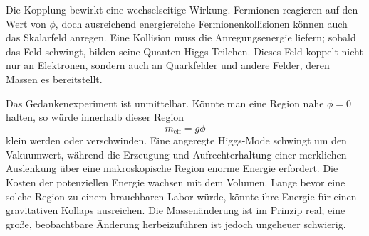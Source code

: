 Die Kopplung bewirkt eine wechselseitige Wirkung. Fermionen reagieren auf den Wert von \(\phi\), doch ausreichend energiereiche Fermionenkollisionen können auch das Skalarfeld anregen. Eine Kollision muss die Anregungsenergie liefern; sobald das Feld schwingt, bilden seine Quanten Higgs-Teilchen. Dieses Feld koppelt nicht nur an Elektronen, sondern auch an Quarkfelder und andere Felder, deren Massen es bereitstellt.

\begin{classroomqa}
\end{classroomqa}

Das Gedankenexperiment ist unmittelbar. Könnte man eine Region nahe \(\phi=0\) halten, so würde innerhalb dieser Region
\begin{equation}
m_{\mathrm{eff}}=g\phi
\end{equation}
klein werden oder verschwinden. Eine angeregte Higgs-Mode schwingt um den Vakuumwert, während die Erzeugung und Aufrechterhaltung einer merklichen Auslenkung über eine makroskopische Region enorme Energie erfordert. Die Kosten der potenziellen Energie wachsen mit dem Volumen. Lange bevor eine solche Region zu einem brauchbaren Labor würde, könnte ihre Energie für einen gravitativen Kollaps ausreichen. Die Massenänderung ist im Prinzip real; eine große, beobachtbare Änderung herbeizuführen ist jedoch ungeheuer schwierig.

\begin{classroomqa}
\end{classroomqa}

\begin{classroomqa}
\end{classroomqa}

